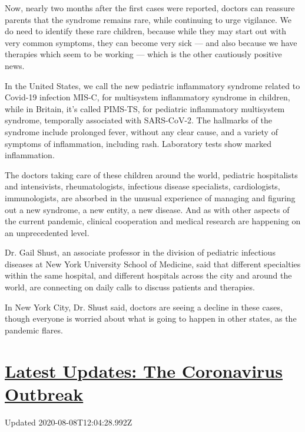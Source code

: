 Now, nearly two months after the first cases were reported, doctors can
reassure parents that the syndrome remains rare, while continuing to
urge vigilance. We do need to identify these rare children, because
while they may start out with very common symptoms, they can become very
sick --- and also because we have therapies which seem to be working ---
which is the other cautiously positive news.

In the United States, we call the new pediatric inflammatory syndrome
related to Covid-19 infection MIS-C, for multisystem inflammatory
syndrome in children, while in Britain, it's called PIMS-TS, for
pediatric inflammatory multisystem syndrome, temporally associated with
SARS-CoV-2. The hallmarks of the syndrome include prolonged fever,
without any clear cause, and a variety of symptoms of inflammation,
including rash. Laboratory tests show marked inflammation.

The doctors taking care of these children around the world, pediatric
hospitalists and intensivists, rheumatologists, infectious disease
specialists, cardiologists, immunologists, are absorbed in the unusual
experience of managing and figuring out a new syndrome, a new entity, a
new disease. And as with other aspects of the current pandemic, clinical
cooperation and medical research are happening on an unprecedented
level.

Dr. Gail Shust, an associate professor in the division of pediatric
infectious diseases at New York University School of Medicine, said that
different specialties within the same hospital, and different hospitals
across the city and around the world, are connecting on daily calls to
discuss patients and therapies.

In New York City, Dr. Shust said, doctors are seeing a decline in these
cases, though everyone is worried about what is going to happen in other
states, as the pandemic flares.

\hypertarget{latest-updates-the-coronavirus-outbreak}{%
\section{\texorpdfstring{\href{https://www.nytimes.com/2020/08/07/world/covid-19-news.html?action=click\&pgtype=Article\&state=default\&region=MAIN_CONTENT_1\&context=storylines_live_updates}{Latest
Updates: The Coronavirus
Outbreak}}{Latest Updates: The Coronavirus Outbreak}}\label{latest-updates-the-coronavirus-outbreak}}

Updated 2020-08-08T12:04:28.992Z


